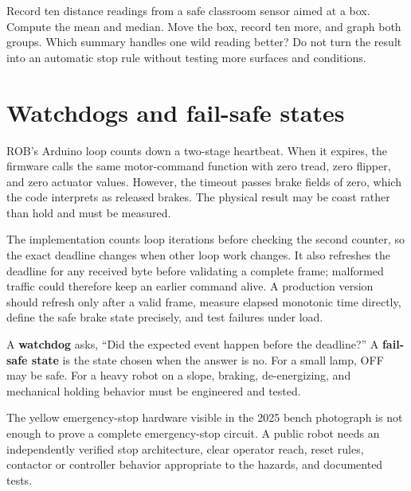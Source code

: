 \documentclass[11pt,openany]{book}
\begin{document}
\begin{buildbox}[title={FILTER A DATA SET}]
Record ten distance readings from a safe classroom sensor aimed at a box. Compute the mean and median. Move the box, record ten more, and graph both groups. Which summary handles one wild reading better? Do not turn the result into an automatic stop rule without testing more surfaces and conditions.
\end{buildbox}


\chapter{Watchdogs and fail-safe states}

ROB's Arduino loop counts down a two-stage heartbeat. When it expires, the firmware calls the same motor-command function with zero tread, zero flipper, and zero actuator values. However, the timeout passes brake fields of zero, which the code interprets as released brakes. The physical result may be coast rather than hold and must be measured.

The implementation counts loop iterations before checking the second counter, so the exact deadline changes when other loop work changes. It also refreshes the deadline for any received byte before validating a complete frame; malformed traffic could therefore keep an earlier command alive. A production version should refresh only after a valid frame, measure elapsed monotonic time directly, define the safe brake state precisely, and test failures under load.

\begin{conceptbox}
A \textbf{watchdog} asks, ``Did the expected event happen before the deadline?'' A \textbf{fail-safe state} is the state chosen when the answer is no. For a small lamp, OFF may be safe. For a heavy robot on a slope, braking, de-energizing, and mechanical holding behavior must be engineered and tested.
\end{conceptbox}

\ROBStopChainDiagram

\begin{safetybox}
The yellow emergency-stop hardware visible in the 2025 bench photograph is not enough to prove a complete emergency-stop circuit. A public robot needs an independently verified stop architecture, clear operator reach, reset rules, contactor or controller behavior appropriate to the hazards, and documented tests.
\end{safetybox}
\end{document}
